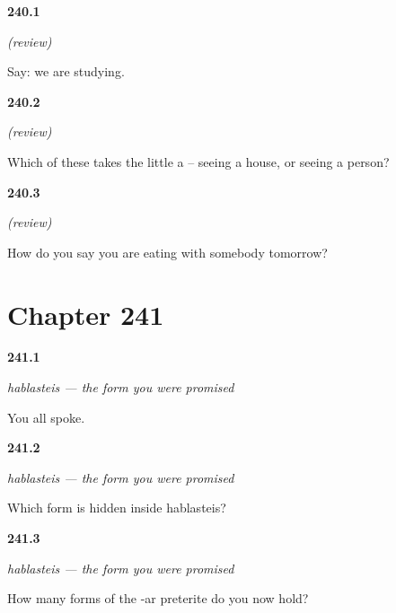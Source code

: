 \noindent\begin{minipage}[t]{\linewidth}
\raggedright
\hypertarget{review-ES-C62-repaso-gerundio-now}{\textbf{240.1}} \emph{(review)}\par
\small Say: we are studying.
\end{minipage}\par\medskip

\noindent\begin{minipage}[t]{\linewidth}
\raggedright
\hypertarget{review-ES-C62-repaso-gerundio-a}{\textbf{240.2}} \emph{(review)}\par
\small Which of these takes the little a -- seeing a house, or seeing a person?
\end{minipage}\par\medskip

\noindent\begin{minipage}[t]{\linewidth}
\raggedright
\hypertarget{review-ES-C62-repaso-gerundio-tomorrow}{\textbf{240.3}} \emph{(review)}\par
\small How do you say you are eating with somebody tomorrow?
\end{minipage}\par\medskip

\section*{Chapter 241}

\noindent\begin{minipage}[t]{\linewidth}
\raggedright
\hypertarget{review-ES-C63-hablasteis-make}{\textbf{241.1}} \emph{hablasteis — the form you were promised}\par
\small You all spoke.
\end{minipage}\par\medskip

\noindent\begin{minipage}[t]{\linewidth}
\raggedright
\hypertarget{review-ES-C63-hablasteis-parts}{\textbf{241.2}} \emph{hablasteis — the form you were promised}\par
\small Which form is hidden inside hablasteis?
\end{minipage}\par\medskip

\noindent\begin{minipage}[t]{\linewidth}
\raggedright
\hypertarget{review-ES-C63-hablasteis-whole}{\textbf{241.3}} \emph{hablasteis — the form you were promised}\par
\small How many forms of the -ar preterite do you now hold?
\end{minipage}\par\medskip

